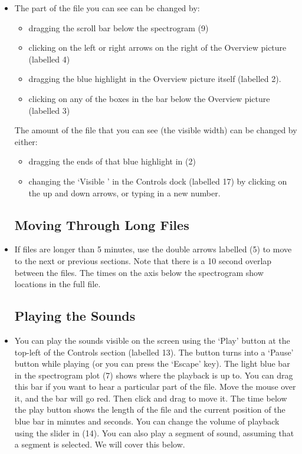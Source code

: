 \documentclass{article}
\begin{document}
\begin{itemize}
\item The part of the file you can see can be changed by:
	\begin{itemize}
	\item dragging the scroll bar below the spectrogram (9)
	\item clicking on the left or right arrows on the right of the Overview picture (labelled 4)
	\item dragging the blue highlight in the Overview picture itself (labelled 2). 
	\item clicking on any of the boxes in the bar below the Overview picture (labelled 3)
	\end{itemize}
	The amount of the file that you can see (the visible width) can be changed by either: 
	\begin{itemize}
	\item dragging the ends of that blue highlight in (2)
	\item changing the `Visible ' in the Controls dock (labelled 17) by clicking on the up and down arrows, or typing in a new number.
	\end{itemize}

\subsection{Moving Through Long Files}

\item If files are longer than 5 minutes, use the double arrows labelled (5) to move to the next or previous sections. Note that there is a 10 second overlap between the files.  The times on the axis below the spectrogram show locations in the full file.

\subsection{Playing the Sounds}

\item You can play the sounds visible on the screen using the `Play' button at the top-left of the Controls section (labelled 13). The button turns into a `Pause' button while playing (or you can press the `Escape' key). The light blue bar in the spectrogram plot (7)  shows where the playback is up to. You can drag this bar if you want to hear a particular part of the file. Move the mouse over it, and the bar will go red. Then click and drag to move it. The time below the play button shows the length of the file and the current position of the blue bar in minutes and seconds. You can change the volume of playback using the slider in (14). 
You can also play a segment of sound, assuming that a segment is selected. We will cover this below.


\end{itemize}
\end{document}
